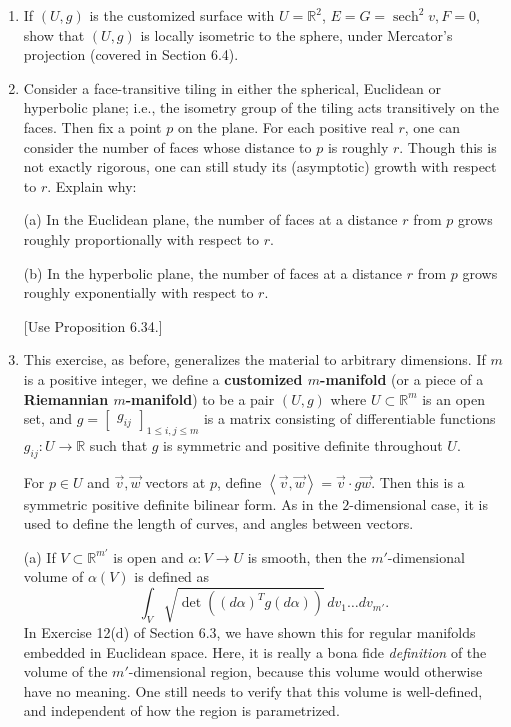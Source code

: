\documentclass[leqno]{book}
\begin{document}
\begin{enumerate}
\item If $(U,g)$ is the customized surface with $U=\mathbb R^2$, $E=G=\operatorname{sech}^2v,F=0$, show that $(U,g)$ is locally isometric to the sphere, under Mercator's projection (covered in Section 6.4).

\item Consider a face-transitive tiling in either the spherical, Euclidean or hyperbolic plane; i.e., the isometry group of the tiling acts transitively on the faces.  Then fix a point $p$ on the plane.  For each positive real $r$, one can consider the number of faces whose distance to $p$ is roughly $r$.  Though this is not exactly rigorous, one can still study its (asymptotic) growth with respect to $r$.  Explain why:

(a) In the Euclidean plane, the number of faces at a distance $r$ from $p$ grows roughly proportionally with respect to $r$.

(b) In the hyperbolic plane, the number of faces at a distance $r$ from $p$ grows roughly exponentially with respect to $r$.

[Use Proposition 6.34.]

\item This exercise, as before, generalizes the material to arbitrary dimensions.  If $m$ is a positive integer, we define a \textbf{customized $m$-manifold} (or a piece of a \textbf{Riemannian $m$-manifold}) to be a pair $(U,g)$ where $U\subset\mathbb R^m$ is an open set, and $g=\begin{bmatrix}g_{ij}\end{bmatrix}_{1\leqslant i,j\leqslant m}$ is a matrix consisting of differentiable functions $g_{ij}:U\to\mathbb R$ such that $g$ is symmetric and positive definite throughout $U$.

For $p\in U$ and $\vec v,\vec w$ vectors at $p$, define $\left<\vec v,\vec w\right>=\vec v\cdot g\vec w$.  Then this is a symmetric positive definite bilinear form.  As in the $2$-dimensional case, it is used to define the length of curves, and angles between vectors.

(a) If $V\subset\mathbb R^{m'}$ is open and $\alpha:V\to U$ is smooth, then the $m'$-dimensional volume of $\alpha(V)$ is defined as
$$\int_V\sqrt{\det((d\alpha)^Tg(d\alpha))}\,dv_1\dots dv_{m'}.$$
In Exercise 12(d) of Section 6.3, we have shown this for regular manifolds embedded in Euclidean space.  Here, it is really a bona fide \emph{definition} of the volume of the $m'$-dimensional region, because this volume would otherwise have no meaning.  One still needs to verify that this volume is well-defined, and independent of how the region is parametrized.


\end{enumerate}
\end{document}
